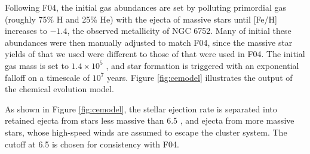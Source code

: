 Following F04, the initial gas abundances are set by polluting primordial gas (roughly 75\% H and 25\% He) with the ejecta of massive stars until [Fe/H] increases to $-1.4$, the observed metallicity of NGC 6752. Many of initial these abundances were then manually adjusted to match F04, since the massive star yields of \citet{Kobayashi:2006fh} that we used were different to those of \citet{Chieffi:2002gl} that were used in F04. The initial gas mass is set to $1.4 \times 10^5$ \Msun, and star formation is triggered with an exponential falloff on a timescale of $10^7$ years. Figure \ref{fig:cemodel} illustrates the output of the chemical evolution model.

As shown in Figure \ref{fig:cemodel}, the stellar ejection rate is separated into retained ejecta from stars less massive than 6.5 \Msun, and ejecta from more massive stars, whose high-speed winds are assumed to escape the cluster system. The cutoff at 6.5 \Msun is chosen for consistency with F04.

